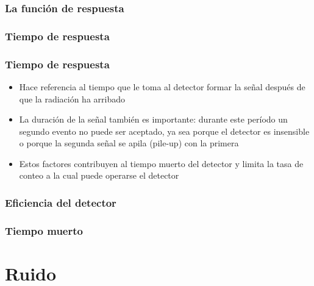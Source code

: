 \documentclass{beamer}
\begin{document}
\subsubsection{La funci\'on de respuesta}

\subsubsection{Tiempo de respuesta}

\begin{frame}
\frametitle{Tiempo de respuesta}
\begin{exampleblock}{}
\begin{itemize}
\item Hace referencia al tiempo que le toma al detector formar la señal despu\'es de que la radiaci\'on ha arribado
\end{itemize}
\end{exampleblock}
\begin{alertblock}{}
\begin{itemize}
\item La duraci\'on de la señal tambi\'en es importante: \alert{durante 
este per\'iodo un segundo evento no puede ser aceptado, ya 
sea porque el detector es insensible o porque la segunda 
señal se apila (pile-up) con la primera}
\item Estos factores contribuyen al \alert{tiempo muerto} del detector 
y limita la tasa de conteo a la cual puede operarse el detector
\end{itemize}
\end{alertblock}
\end{frame} 

\subsubsection{Eficiencia del detector}

\subsubsection{Tiempo muerto}

\section{Ruido}
\end{document}
